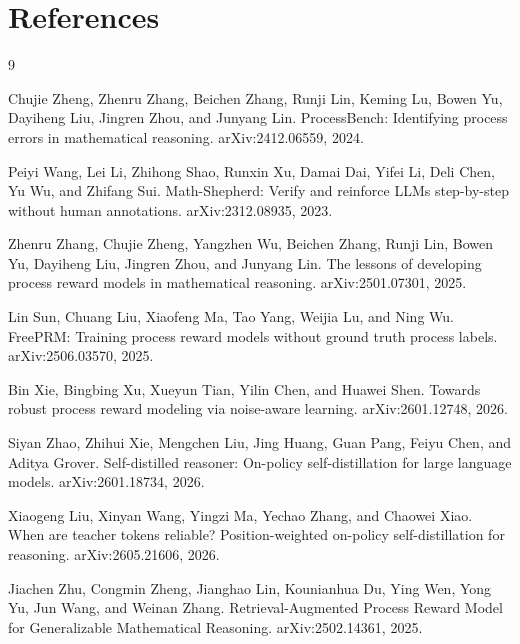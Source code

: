 \documentclass{article}
\begin{document}
\section*{References}

\begin{thebibliography}{9}

Chujie Zheng, Zhenru Zhang, Beichen Zhang, Runji Lin, Keming Lu, Bowen Yu, Dayiheng Liu, Jingren Zhou, and Junyang Lin.
\newblock ProcessBench: Identifying process errors in mathematical reasoning.
\newblock arXiv:2412.06559, 2024.

Peiyi Wang, Lei Li, Zhihong Shao, Runxin Xu, Damai Dai, Yifei Li, Deli Chen, Yu Wu, and Zhifang Sui.
\newblock Math-Shepherd: Verify and reinforce LLMs step-by-step without human annotations.
\newblock arXiv:2312.08935, 2023.

Zhenru Zhang, Chujie Zheng, Yangzhen Wu, Beichen Zhang, Runji Lin, Bowen Yu, Dayiheng Liu, Jingren Zhou, and Junyang Lin.
\newblock The lessons of developing process reward models in mathematical reasoning.
\newblock arXiv:2501.07301, 2025.

Lin Sun, Chuang Liu, Xiaofeng Ma, Tao Yang, Weijia Lu, and Ning Wu.
\newblock FreePRM: Training process reward models without ground truth process labels.
\newblock arXiv:2506.03570, 2025.

Bin Xie, Bingbing Xu, Xueyun Tian, Yilin Chen, and Huawei Shen.
\newblock Towards robust process reward modeling via noise-aware learning.
\newblock arXiv:2601.12748, 2026.

Siyan Zhao, Zhihui Xie, Mengchen Liu, Jing Huang, Guan Pang, Feiyu Chen, and Aditya Grover.
\newblock Self-distilled reasoner: On-policy self-distillation for large language models.
\newblock arXiv:2601.18734, 2026.

Xiaogeng Liu, Xinyan Wang, Yingzi Ma, Yechao Zhang, and Chaowei Xiao.
\newblock When are teacher tokens reliable? Position-weighted on-policy self-distillation for reasoning.
\newblock arXiv:2605.21606, 2026.

Jiachen Zhu, Congmin Zheng, Jianghao Lin, Kounianhua Du, Ying Wen, Yong Yu, Jun Wang, and Weinan Zhang.
\newblock Retrieval-Augmented Process Reward Model for Generalizable Mathematical Reasoning.
\newblock arXiv:2502.14361, 2025.


\end{thebibliography}
\end{document}
